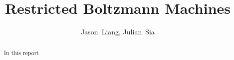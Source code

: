 \documentclass[journal]{IEEEtran}
\begin{document}
%
\title{Restricted Boltzmann Machines}


\author{Jason~Liang,
        Julian~Sia%
}

% 
%

\maketitle

\begin{abstract}
In this report 
\end{abstract}

\IEEEpeerreviewmaketitle
\end{document}

